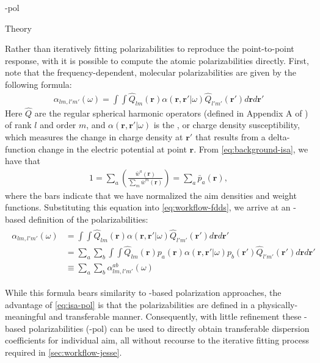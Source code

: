 \begin{subsubsection}{\isa-pol}
\label{sec:workflow-alston}

\begin{paragraph}{Theory}

Rather than iteratively fitting polarizabilities to reproduce the
point-to-point response, with \isa it is possible to
compute the atomic polarizabilities directly. First, note that the
frequency-dependent, molecular polarizabilities are given by the following formula:
\begin{align}
\label{eq:workflow-fdds}
\alpha_{lm,l'm'}(\omega) = \int \int
\hat{Q}_{lm}(\bm{r})
\alpha(\bm{r},\bm{r'}|\omega)
\hat{Q}_{l'm'}(\bm{r'})d\bm{r}d\bm{r'}
\end{align}
Here $\hat{Q}$ are the regular spherical harmonic operators (defined in
Appendix A of ) of rank $l$ and order $m$, and 
$\alpha(\bm{r},\bm{r'}|\omega)$ is the \fdds, or charge density
susceptibility, which measures the change in charge density at $\bm{r'}$ that
results from a delta-function change in the electric potential at point
$\bm{r}$. From \cref{eq:background-isa}, we have that
\begin{align}
1 = \sum\limits_a \left ( 
\frac{\bar{w}^a(\bm{r})}{\sum_m \bar{w}^m(\bm{r})}
\right )
= \sum\limits_a \bar{p}_a(\bm{r}),
\end{align}
where the bars indicate that we have normalized the \acrlong{aim} densities
and weight functions. Substituting this
equation into \cref{eq:workflow-fdds}, we arrive at an \isa-based definition
of the \aim polarizabilities:
\begin{align}
\label{eq:isa-pol}
\begin{split}
\alpha_{lm,l'm'}(\omega) &= \int \int
\hat{Q}_{lm}(\bm{r})
\alpha(\bm{r},\bm{r'}|\omega)
\hat{Q}_{l'm'}(\bm{r'})d\bm{r}d\bm{r'} \\
%
&= \sum\limits_a \sum\limits_b \int \int
\hat{Q}_{lm}(\bm{r})
p_a(\bm{r})
\alpha(\bm{r},\bm{r'}|\omega)
p_b(\bm{r'})
\hat{Q}_{l'm'}(\bm{r'})d\bm{r}d\bm{r'} \\
%
&\equiv \sum\limits_a \sum\limits_b 
\alpha_{lm,l'm'}^{ab}(\omega) 
\end{split}
\end{align}

While this formula bears similarity to \dma-based polarization
approaches,\cite{Williams2003,Misquitta2008} the advantage of
\cref{eq:isa-pol} is that the \aim polarizabilities are defined in a
physically-meaningful and transferable manner.
Consequently, with little refinement these \isa-based polarizabilities (\isa-pol) can be used to
directly obtain transferable dispersion coefficients for individual
\acrlong{aim},
all without recourse to the iterative fitting process required in
\cref{sec:workflow-jesse}.



\end{paragraph}
\end{subsubsection}
